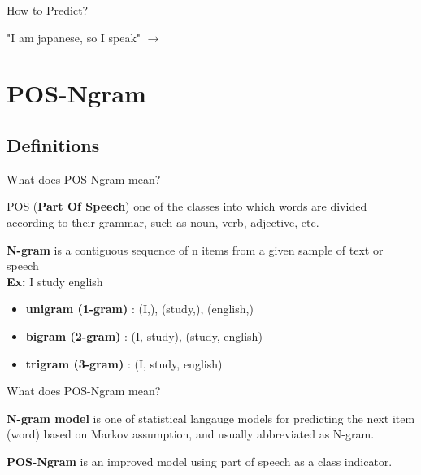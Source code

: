 \documentclass{beamer}
\begin{document}
\begin{frame}{How to \textcolor[rgb]{0.8,0.2,0}{Predict}?}
    \centering

    "I am japanese, so I speak" $\rightarrow$ 
\end{frame}
\section{POS-Ngram}
\subsection{Definitions}

\begin{frame}{What does POS-Ngram mean?}
    \begin{definition}{POS (\textbf{Part Of Speech})}
        one of the classes into which words are divided according to their grammar,
        such as noun, verb, adjective, etc.
    \end{definition}
    \begin{definition}{\textbf{N-gram}}
        is a contiguous sequence of n items from a given sample of text or speech\\
        \textbf{Ex: } I study english
        \begin{itemize}
            \item \textbf{unigram (1-gram)} : (I,), (study,), (english,)
            \item \textbf{bigram (2-gram)} : (I, study), (study, english) 
            \item \textbf{trigram (3-gram)} : (I, study, english)
        \end{itemize}
    \end{definition}
\end{frame}

\begin{frame}{What does POS-Ngram mean?}
    \begin{definition}{\textbf{N-gram model}}
        is one of statistical langauge models for predicting the next item (word) based on Markov assumption, and usually abbreviated as N-gram.
    \end{definition}
    \begin{definition}{\textbf{POS-Ngram}}
        is an improved model using part of speech as a class indicator.
    \end{definition}
\end{frame}
\end{document}
